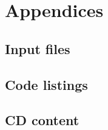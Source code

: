 \documentclass[12pt, twoside, a4paper, openright]{report}
\begin{document}

\part*{Appendices}

\appendix

\chapter{Input files}


\chapter{Code listings}


\chapter{CD content}

\end{document}
